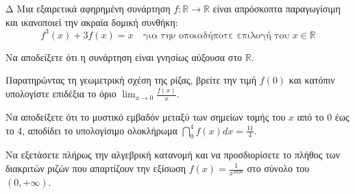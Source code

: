 \begin{thema}{Δ}
Μια εξαιρετικά αφηρημένη συνάρτηση $f: \mathbb{R} \to \mathbb{R}$ είναι απρόσκοπτα παραγωγίσιμη και ικανοποιεί την ακραία δομική συνθήκη:
\[ f^3(x) + 3f(x) = x \quad \text{για την οποιαδήποτε επιλογή του } x \in \mathbb{R} \]
\begin{erwthma}
    \item Να αποδείξετε ότι η συνάρτηση είναι γνησίως αύξουσα στο $\mathbb{R}$. 
    \item Παρατηρώντας τη γεωμετρική σχέση της ρίζας, βρείτε την τιμή $f(0)$ και κατόπιν υπολογίστε επιδέξια το όριο $\displaystyle\lim_{x\to 0} \frac{f(x)}{x}$. 
    \item Να αποδείξετε ότι το μυστικό εμβαδόν μεταξύ των σημείων τομής του $x$ από το $0$ έως το $4$, αποδίδει το υπολογίσιμο ολοκλήρωμα $\dint_0^4 f(x) dx = \frac{11}{4}$. 
    \item Να εξετάσετε πλήρως την αλγεβρική κατανομή και να προσδιορίσετε το πλήθος των διακριτών ριζών που απαρτίζουν την εξίσωση $f(x) = \frac{1}{x^{2026}}$ στο σύνολο του $(0, +\infty)$. 
\end{erwthma}
\end{thema}
